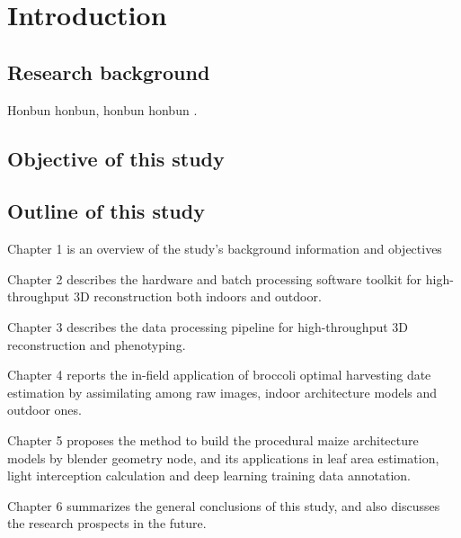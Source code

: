 \chapter{Introduction}

\section{Research background}

Honbun honbun, honbun honbun \citep{guo_deep_2019, zhao_crop_2019}. 


\section{Objective of this study}


\section{Outline of this study}

Chapter 1 is an overview of the study's background information and objectives

Chapter 2 describes the hardware and batch processing software toolkit for high-throughput 3D reconstruction both indoors and outdoor.

Chapter 3 describes the data processing pipeline for high-throughput 3D reconstruction and phenotyping.

Chapter 4 reports the in-field application of broccoli optimal harvesting date estimation by assimilating among raw images, indoor architecture models and outdoor ones.

Chapter 5 proposes the method to build the procedural maize architecture models by blender geometry node, and its applications in leaf area estimation, light interception calculation and deep learning training data annotation.

Chapter 6 summarizes the general conclusions of this study, and also discusses the research prospects in the future.